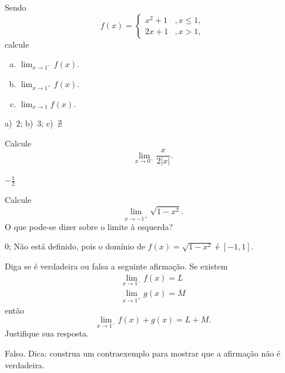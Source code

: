 \begin{exer}
  Sendo
  \begin{equation}
    f(x) = \left\{
      \begin{array}{ll}
        x^2+1 &, x\leq 1,\\
        2x+1 &, x>1,
      \end{array}
    \right.
  \end{equation}
  calcule
  \begin{enumerate}[a)]
  \item $\displaystyle \lim_{x\to 1^-} f(x)$.
  \item $\displaystyle \lim_{x\to 1^+} f(x)$.
  \item $\displaystyle \lim_{x\to 1} f(x)$.
  \end{enumerate}
\end{exer}
\begin{resp}
  a)~$2$; b)~$3$; c)~$\nexists$
\end{resp}

\begin{exer}
  Calcule
  \begin{equation}
    \lim_{x\to 0^-} \frac{x}{2|x|}.
  \end{equation}
\end{exer}
\begin{resp}
  $-\frac{1}{2}$
\end{resp}

\begin{exer}
  Calcule
  \begin{equation}
    \lim_{x\to -1^+} \sqrt{1-x^2}.
  \end{equation}
  O que pode-se dizer sobre o limite à esquerda?
\end{exer}
\begin{resp}
  $0$; Não está definido, pois o domínio de $f(x)=\sqrt{1-x^2}$ é $[-1, 1]$.
\end{resp}

\begin{exer}
  Diga se é verdadeira ou falsa a seguinte afirmação. Se existem
  \begin{gather}
    \lim_{x\to 1^-} f(x) = L\\
    \lim_{x\to 1^+} g(x) = M
  \end{gather}
  então
  \begin{equation}
    \lim_{x\to 1^-} f(x) + g(x) = L + M.
  \end{equation}
  Justifique sua resposta.
\end{exer}
\begin{resp}
  Falso. Dica: construa um contraexemplo para mostrar que a afirmação não é verdadeira. 
\end{resp}


